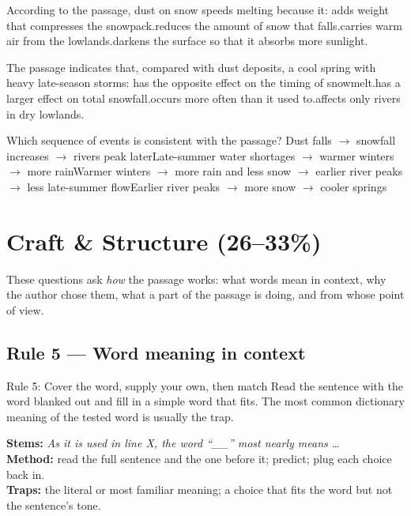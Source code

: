 \documentclass[11pt]{article}
\begin{document}
{According to the passage, dust on snow speeds melting because it:}
{adds weight that compresses the snowpack.}{reduces the amount of snow that falls.}{carries warm air from the lowlands.}{darkens the surface so that it absorbs more sunlight.}

{The passage indicates that, compared with dust deposits, a cool spring with heavy late-season storms:}
{has the opposite effect on the timing of snowmelt.}{has a larger effect on total snowfall.}{occurs more often than it used to.}{affects only rivers in dry lowlands.}

{Which sequence of events is consistent with the passage?}
{Dust falls $\rightarrow$ snowfall increases $\rightarrow$ rivers peak later}{Late-summer water shortages $\rightarrow$ warmer winters $\rightarrow$ more rain}{Warmer winters $\rightarrow$ more rain and less snow $\rightarrow$ earlier river peaks $\rightarrow$ less late-summer flow}{Earlier river peaks $\rightarrow$ more snow $\rightarrow$ cooler springs}

\section{Craft \& Structure (26--33\%)}
These questions ask \emph{how} the passage works: what words mean in context, why the author chose them, what a part of the passage is doing, and from whose point of view.

\subsection{Rule 5 --- Word meaning in context}
\begin{rulebox}{Rule 5: Cover the word, supply your own, then match}
Read the sentence with the word blanked out and fill in a simple word that fits. The most common dictionary meaning of the tested word is usually the trap.
\end{rulebox}
\textbf{Stems:} \emph{As it is used in line X, the word ``\_\_'' most nearly means \dots}\\
\textbf{Method:} read the full sentence and the one before it; predict; plug each choice back in.\\
\textbf{Traps:} the literal or most familiar meaning; a choice that fits the word but not the sentence's tone.
\end{document}

